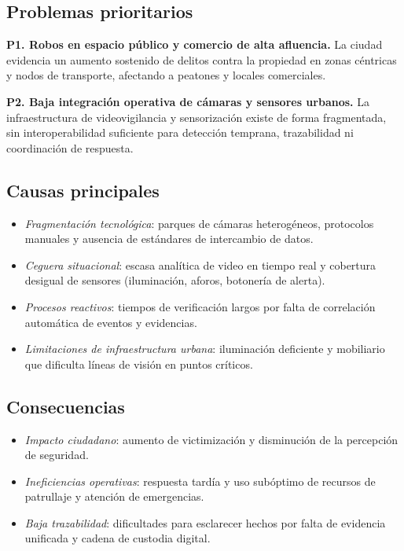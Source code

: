 \documentclass[12pt,a4paper]{article}
\begin{document}
\subsection*{Problemas prioritarios}
\textbf{P1. Robos en espacio público y comercio de alta afluencia.} La ciudad evidencia un aumento sostenido de delitos contra la propiedad en zonas céntricas y nodos de transporte, afectando a peatones y locales comerciales.

\textbf{P2. Baja integración operativa de cámaras y sensores urbanos.} La infraestructura de videovigilancia y sensorización existe de forma fragmentada, sin interoperabilidad suficiente para detección temprana, trazabilidad ni coordinación de respuesta.

\subsection*{Causas principales}
\begin{itemize}
    \item \textit{Fragmentación tecnológica}: parques de cámaras heterogéneos, protocolos manuales y ausencia de estándares de intercambio de datos.
    \item \textit{Ceguera situacional}: escasa analítica de video en tiempo real y cobertura desigual de sensores (iluminación, aforos, botonería de alerta).
    \item \textit{Procesos reactivos}: tiempos de verificación largos por falta de correlación automática de eventos y evidencias.
    \item \textit{Limitaciones de infraestructura urbana}: iluminación deficiente y mobiliario que dificulta líneas de visión en puntos críticos.
\end{itemize}

\subsection*{Consecuencias}
\begin{itemize}
    \item \textit{Impacto ciudadano}: aumento de victimización y disminución de la percepción de seguridad.
    \item \textit{Ineficiencias operativas}: respuesta tardía y uso subóptimo de recursos de patrullaje y atención de emergencias.
    \item \textit{Baja trazabilidad}: dificultades para esclarecer hechos por falta de evidencia unificada y cadena de custodia digital.
\end{itemize}
\end{document}
